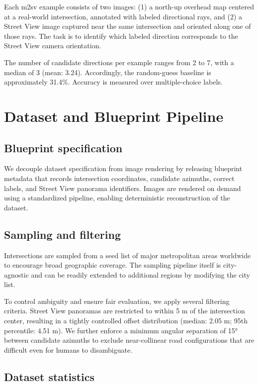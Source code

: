 \documentclass{article}
\begin{document}
Each m2sv example consists of two images: (1) a north-up overhead map centered at
a real-world intersection, annotated with labeled directional rays, and (2) a
Street View image captured near the same intersection and oriented along one of
those rays. The task is to identify which labeled direction corresponds to the
Street View camera orientation.

The number of candidate directions per example ranges from 2 to 7, with a median
of 3 (mean: 3.24). Accordingly, the random-guess baseline is approximately
31.4\%. Accuracy is measured over multiple-choice labels.



\section{Dataset and Blueprint Pipeline}

\subsection{Blueprint specification}

We decouple dataset specification from image rendering by releasing blueprint
metadata that records intersection coordinates, candidate azimuths, correct
labels, and Street View panorama identifiers. Images are rendered on demand using
a standardized pipeline, enabling deterministic reconstruction of the dataset.

\subsection{Sampling and filtering}

Intersections are sampled from a seed list of major metropolitan areas worldwide
to encourage broad geographic coverage. The sampling pipeline itself is
city-agnostic and can be readily extended to additional regions by modifying the
city list.

To control ambiguity and ensure fair evaluation, we apply several filtering
criteria. Street View panoramas are restricted to within 5 m of the intersection
center, resulting in a tightly controlled offset distribution (median: 2.05 m;
95th percentile: 4.51 m). We further enforce a minimum angular separation of 15°
between candidate azimuths to exclude near-collinear road configurations that are
difficult even for humans to disambiguate.

\subsection{Dataset statistics}
\end{document}
